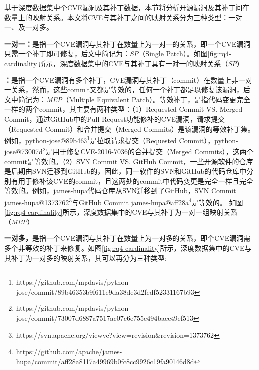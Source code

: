 基于深度数据集中个CVE漏洞及其补丁数据，本节将分析开源漏洞及其补丁间在数量上的映射关系。本文将CVE与其补丁之间的映射关系分为三种类型：一对一、及一对多。

\textbf{一对一：}是指一个CVE漏洞与其补丁在数量上为一对一的关系，即一个CVE漏洞只需一个补丁即可修复，后文中简记为：\textit{SP}（Single Patch）。如图\ref{fig:rq4-cardinality}所示，深度数据集中的CVE与其补丁具有一对一的映射关系（\textit{SP}）

\textbf{：}是指一个CVE漏洞有多个补丁，CVE漏洞与其补丁（commit）在数量上非一对一关系，然而，这些commit又都是等效的，任何一个补丁都足以修复该漏洞，后文中简记为：\textit{MEP}（Multiple Equivalent Patch）。等效补丁，是指代码变更完全一样的两个commit，其主要有两种类型：（1）Requested Commit VS. Merged Commit，通过GitHub中的Pull Request功能修补的CVE漏洞，请求提交（Requested Commit）和合并提交（Merged Commits）是该漏洞的等效补丁集。例如，python-jose@89b463\footnote{https://github.com/mpdavis/python-jose/commit/89b46353b9f611e9da38de3d2fedf52331167b93}是拉取请求提交（Requested Commit），python-jose@73007d\footnote{https://github.com/mpdavis/python-jose/commit/73007d6887a7517ac07c6e755e494baee49ef513}是用于修复CVE-2016-7036的合并提交（Merged Commits），这两个commit是等效的。（2）SVN Commit VS. GitHub Commit，一些开源软件的仓库是后期由SVN迁移到GitHub的，因此，同一软件的SVN和GitHub的代码仓库中分别有用于修补该CVE的commit，且这两处的commit中代码变更是完全一样且完全等效的。例如，james-hupa代码仓库从SVN迁移到了GitHub，SVN Commit james-hupa@1373762\footnote{https://svn.apache.org/viewvc?view=revision\&revision=1373762}与GitHub Commit james-hupa@aff28a\footnote{https://github.com/apache/james-hupa/commit/aff28a8117a49969b0fc8cc9926c19fa90146d8d}是等效的。
如图\ref{fig:rq4-cardinality}所示，深度数据集中的CVE与其补丁为一对一组映射关系（\textit{MEP}）

\textbf{一对多，}是指一个CVE漏洞与其补丁在数量上为一对多的关系，即个CVE漏洞需多个非等效的补丁来修复。如图\ref{fig:rq4-cardinality}所示，深度数据集中的CVE与其补丁为一对多的映射关系，其可以再分为三种类型: 

